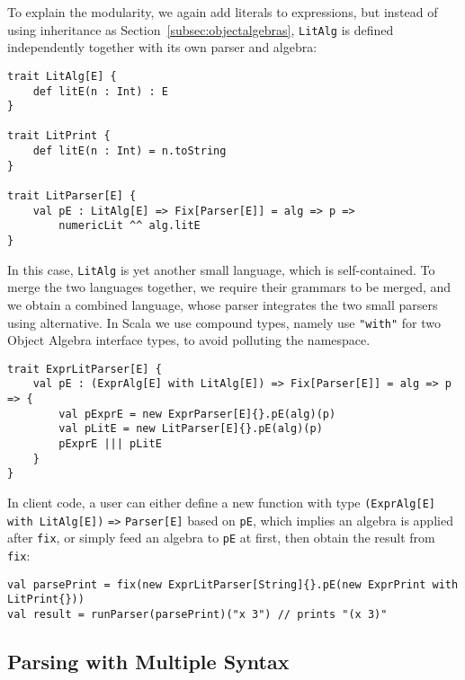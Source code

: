 To explain the modularity, we again add literals to expressions, but instead of using inheritance as Section~\ref{subsec:objectalgebras}, \lstinline{LitAlg} is defined independently together with its own parser and algebra:
\begin{lstlisting}
trait LitAlg[E] {
    def litE(n : Int) : E
}

trait LitPrint {
    def litE(n : Int) = n.toString
}

trait LitParser[E] {
    val pE : LitAlg[E] => Fix[Parser[E]] = alg => p =>
        numericLit ^^ alg.litE
}
\end{lstlisting}
In this case, \lstinline{LitAlg} is yet another small language, which is self-contained. To merge the two languages together, we require their grammars
to be merged, and we obtain a combined language, whose parser integrates the two small parsers using alternative. In Scala we use compound types, namely use \lstinline{"with"} for two Object Algebra interface types, to avoid polluting the namespace.

\begin{lstlisting}
trait ExprLitParser[E] {
    val pE : (ExprAlg[E] with LitAlg[E]) => Fix[Parser[E]] = alg => p => {
        val pExprE = new ExprParser[E]{}.pE(alg)(p)
        val pLitE = new LitParser[E]{}.pE(alg)(p)
        pExprE ||| pLitE
    }
}
\end{lstlisting}

In client code, a user can either define a new function with type \lstinline{(ExprAlg[E] with LitAlg[E])} \lstinline{=>} \lstinline{Parser[E]} based on \lstinline{pE}, which implies an algebra is applied after \lstinline{fix}, or simply feed an algebra to \lstinline{pE} at first, then obtain the result from \lstinline{fix}:
\begin{lstlisting}
val parsePrint = fix(new ExprLitParser[String]{}.pE(new ExprPrint with LitPrint{}))
val result = runParser(parsePrint)("x 3") // prints "(x 3)"
\end{lstlisting}

\subsection{Parsing with Multiple Syntax}\label{subsec:differentsyntax}

